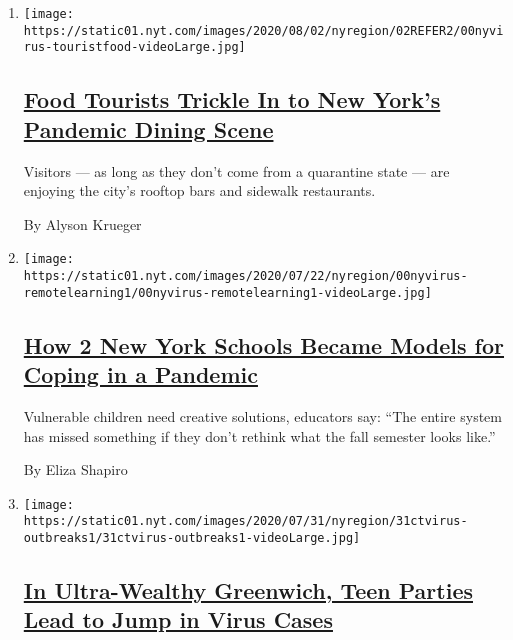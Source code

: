 \begin{enumerate}
\def\labelenumi{\arabic{enumi}.}
\item
  \texttt{[image: https://static01.nyt.com/images/2020/08/02/nyregion/02REFER2/00nyvirus-touristfood-videoLarge.jpg]}

  \hypertarget{food-tourists-trickle-in-to-new-yorks-pandemic-dining-scene}{%
  \subsection{\texorpdfstring{\href{/2020/07/30/nyregion/coronavirus-nyc-tourism-restaurants.html}{Food
  Tourists Trickle In to New York's Pandemic Dining
  Scene}}{Food Tourists Trickle In to New York's Pandemic Dining Scene}}\label{food-tourists-trickle-in-to-new-yorks-pandemic-dining-scene}}

  Visitors --- as long as they don't come from a quarantine state ---
  are enjoying the city's rooftop bars and sidewalk restaurants.

  By Alyson Krueger
\item
  \texttt{[image: https://static01.nyt.com/images/2020/07/22/nyregion/00nyvirus-remotelearning1/00nyvirus-remotelearning1-videoLarge.jpg]}

  \hypertarget{how-2-new-york-schools-became-models-for-coping-in-a-pandemic}{%
  \subsection{\texorpdfstring{\href{/2020/07/31/nyregion/nyc-homeless-children-school.html}{How
  2 New York Schools Became Models for Coping in a
  Pandemic}}{How 2 New York Schools Became Models for Coping in a Pandemic}}\label{how-2-new-york-schools-became-models-for-coping-in-a-pandemic}}

  Vulnerable children need creative solutions, educators say: ``The
  entire system has missed something if they don't rethink what the fall
  semester looks like.''

  By Eliza Shapiro
\item
  \texttt{[image: https://static01.nyt.com/images/2020/07/31/nyregion/31ctvirus-outbreaks1/31ctvirus-outbreaks1-videoLarge.jpg]}

  \hypertarget{in-ultra-wealthy-greenwich-teen-parties-lead-to-jump-in-virus-cases}{%
  \subsection{\texorpdfstring{\href{/2020/07/31/nyregion/greenwich-ct-coronavirus-covid-parties.html}{In
  Ultra-Wealthy Greenwich, Teen Parties Lead to Jump in Virus
  Cases}}{In Ultra-Wealthy Greenwich, Teen Parties Lead to Jump in Virus Cases}}\label{in-ultra-wealthy-greenwich-teen-parties-lead-to-jump-in-virus-cases}}


\end{enumerate}
